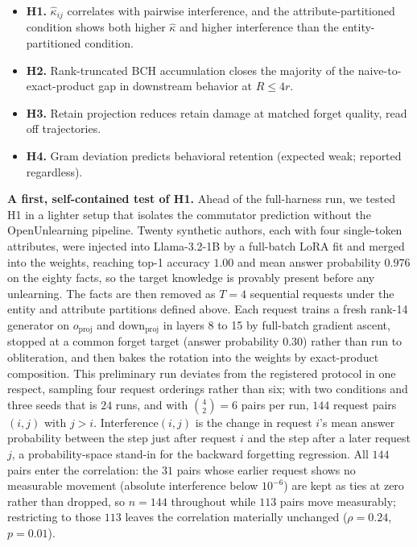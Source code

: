 \documentclass[
]{article}
\providecommand{\tightlist}{%
  \setlength{\itemsep}{0pt}\setlength{\parskip}{0pt}}
\begin{document}
\begin{itemize}
\tightlist
\item
  \textbf{H1.} \(\hat{\kappa}_{ij}\) correlates with pairwise interference, and the attribute-partitioned condition shows both higher \(\hat{\kappa}\) and higher interference than the entity-partitioned condition.
\item
  \textbf{H2.} Rank-truncated BCH accumulation closes the majority of the naive-to-exact-product gap in downstream behavior at \(R\leq 4r\).
\item
  \textbf{H3.} Retain projection reduces retain damage at matched forget quality, read off trajectories.
\item
  \textbf{H4.} Gram deviation predicts behavioral retention (expected weak; reported regardless).
\end{itemize}

\textbf{A first, self-contained test of H1.} Ahead of the full-harness run, we tested H1 in a lighter setup that isolates the commutator prediction without the OpenUnlearning pipeline. Twenty synthetic authors, each with four single-token attributes, were injected into Llama-3.2-1B by a full-batch LoRA fit and merged into the weights, reaching top-1 accuracy \(1.00\) and mean answer probability \(0.976\) on the eighty facts, so the target knowledge is provably present before any unlearning. The facts are then removed as \(T=4\) sequential requests under the entity and attribute partitions defined above. Each request trains a fresh rank-14 generator on \(o_{\mathrm{proj}}\) and \(\mathrm{down}_{\mathrm{proj}}\) in layers 8 to 15 by full-batch gradient ascent, stopped at a common forget target (answer probability \(0.30\)) rather than run to obliteration, and then bakes the rotation into the weights by exact-product composition. This preliminary run deviates from the registered protocol in one respect, sampling four request orderings rather than six; with two conditions and three seeds that is \(24\) runs, and with \(\binom{4}{2}=6\) pairs per run, \(144\) request pairs \((i,j)\) with \(j>i\). Interference\((i,j)\) is the change in request \(i\)'s mean answer probability between the step just after request \(i\) and the step after a later request \(j\), a probability-space stand-in for the backward forgetting regression. All \(144\) pairs enter the correlation: the \(31\) pairs whose earlier request shows no measurable movement (absolute interference below \(10^{-6}\)) are kept as ties at zero rather than dropped, so \(n=144\) throughout while \(113\) pairs move measurably; restricting to those \(113\) leaves the correlation materially unchanged (\(\rho=0.24\), \(p=0.01\)).
\end{document}

